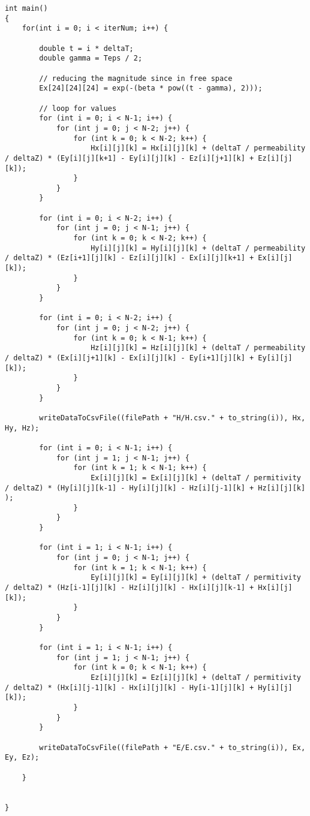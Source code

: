 \begin{verbatim}
int main()
{
	for(int i = 0; i < iterNum; i++) {
		
		double t = i * deltaT;
		double gamma = Teps / 2;
		
		// reducing the magnitude since in free space
		Ex[24][24][24] = exp(-(beta * pow((t - gamma), 2)));
		
		// loop for values
		for (int i = 0; i < N-1; i++) {
			for (int j = 0; j < N-2; j++) {
				for (int k = 0; k < N-2; k++) {
					Hx[i][j][k] = Hx[i][j][k] + (deltaT / permeability / deltaZ) * (Ey[i][j][k+1] - Ey[i][j][k] - Ez[i][j+1][k] + Ez[i][j][k]);
				}
			}
		}
		
		for (int i = 0; i < N-2; i++) {
			for (int j = 0; j < N-1; j++) {
				for (int k = 0; k < N-2; k++) {
					Hy[i][j][k] = Hy[i][j][k] + (deltaT / permeability / deltaZ) * (Ez[i+1][j][k] - Ez[i][j][k] - Ex[i][j][k+1] + Ex[i][j][k]);
				}
			}
		}
		
		for (int i = 0; i < N-2; i++) {
			for (int j = 0; j < N-2; j++) {
				for (int k = 0; k < N-1; k++) {
					Hz[i][j][k] = Hz[i][j][k] + (deltaT / permeability / deltaZ) * (Ex[i][j+1][k] - Ex[i][j][k] - Ey[i+1][j][k] + Ey[i][j][k]);
				}
			}
		}
		
		writeDataToCsvFile((filePath + "H/H.csv." + to_string(i)), Hx, Hy, Hz);
		
		for (int i = 0; i < N-1; i++) {
			for (int j = 1; j < N-1; j++) {
				for (int k = 1; k < N-1; k++) {
					Ex[i][j][k] = Ex[i][j][k] + (deltaT / permitivity / deltaZ) * (Hy[i][j][k-1] - Hy[i][j][k] - Hz[i][j-1][k] + Hz[i][j][k] );
				}
			}
		}
		
		for (int i = 1; i < N-1; i++) {
			for (int j = 0; j < N-1; j++) {
				for (int k = 1; k < N-1; k++) {
					Ey[i][j][k] = Ey[i][j][k] + (deltaT / permitivity / deltaZ) * (Hz[i-1][j][k] - Hz[i][j][k] - Hx[i][j][k-1] + Hx[i][j][k]);
				}
			}
		}
		
		for (int i = 1; i < N-1; i++) {
			for (int j = 1; j < N-1; j++) {
				for (int k = 0; k < N-1; k++) {
					Ez[i][j][k] = Ez[i][j][k] + (deltaT / permitivity / deltaZ) * (Hx[i][j-1][k] - Hx[i][j][k] - Hy[i-1][j][k] + Hy[i][j][k]);
				}
			}
		}
		
		writeDataToCsvFile((filePath + "E/E.csv." + to_string(i)), Ex, Ey, Ez);
		
	}
	
	
}
\end{verbatim}

